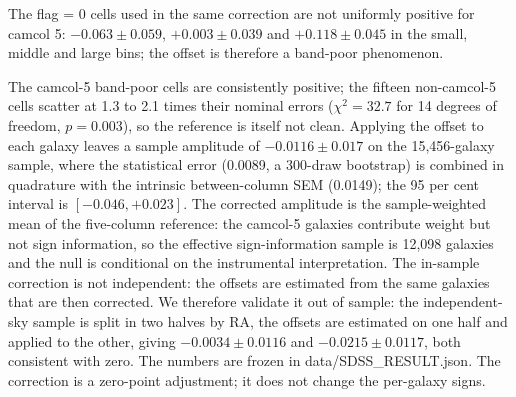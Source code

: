 \documentclass[11pt]{article}
\begin{document}
\noindent The flag = 0 cells used in the same correction are not uniformly positive for camcol 5:
$-0.063 \pm 0.059$, $+0.003 \pm 0.039$ and $+0.118 \pm 0.045$ in the small, middle and large bins;
the offset is therefore a band-poor phenomenon.

The camcol-5 band-poor cells are consistently positive; the fifteen non-camcol-5 cells scatter at
1.3 to 2.1 times their nominal errors ($\chi^2 = 32.7$ for 14 degrees of freedom, $p = 0.003$), so
the reference is itself not clean. Applying the offset to each galaxy leaves a sample amplitude of
$\mathbf{-0.0116 \pm 0.017}$ on the 15,456-galaxy sample, where the statistical error (0.0089, a
300-draw bootstrap) is combined in quadrature with the intrinsic between-column SEM (0.0149); the 95 per cent interval is $[-0.046, +0.023]$. The corrected amplitude is the
sample-weighted mean of the five-column reference: the camcol-5 galaxies contribute weight but not
sign information, so the effective sign-information sample is 12,098 galaxies and the null is
conditional on the instrumental interpretation. The in-sample correction is not independent: the offsets are
estimated from the same galaxies that are then corrected. We therefore validate it out of sample:
the independent-sky sample is split in two halves by RA, the offsets are estimated on one half and
applied to the other, giving $-0.0034 \pm 0.0116$ and $-0.0215 \pm 0.0117$, both consistent with
zero. The numbers are frozen in data/SDSS\_RESULT.json. The correction is a zero-point adjustment;
it does not change the per-galaxy signs.
\end{document}
